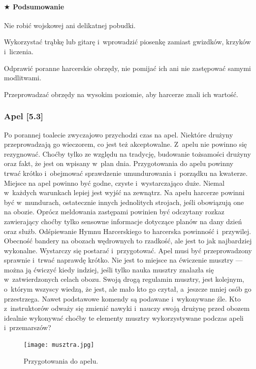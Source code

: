 \documentclass[a5paper,10pt,titlepage,twoside]{article}
\newcommand*{\thecheckbox}{\hss$\Box$} %
\newenvironment*{checklist}
{\list{}{%
\renewcommand*{\makelabel}[1]{\thecheckbox}}}
{\endlist}
\begin{document}
\paragraph{$\bigstar$ Podsumowanie}
\begin{checklist}
\item Nie robić wojskowej ani delikatnej pobudki.
\item Wykorzystać trąbkę lub gitarę i~wprowadzić piosenkę zamiast gwizdków, krzyków i~liczenia.
\item Odprawić poranne harcerskie obrzędy, nie pomijać ich ani nie zastępować samymi modlitwami.
\item Przeprowadzać obrzędy na wysokim poziomie, aby harcerze znali ich wartość.
\end{checklist}
\subsubsection{Apel [5.3]}
Po porannej toalecie zwyczajowo przychodzi czas na apel. Niektóre drużyny przeprowadzają go wieczorem, co jest też akceptowalne. Z~apelu nie powinno się rezygnować. Choćby tylko ze względu na tradycję, budowanie tożsamości drużyny oraz fakt, że jest on wpisany w~plan dnia. Przygotowania do apelu powinny trwać krótko i~obejmować sprawdzenie umundurowania i~porządku na kwaterze. Miejsce na apel powinno być godne, czyste i~wystarczająco duże. Niemal w~każdych warunkach lepiej jest wyjść na zewnątrz. Na apelu harcerze powinni być w~mundurach, ostatecznie innych jednolitych strojach, jeśli obowiązują one na obozie. Oprócz meldowania zastępami powinien być odczytany rozkaz zawierający choćby tylko sensowne informacje dotyczące planów na dany dzień oraz służb. Odśpiewanie Hymnu Harcerskiego to harcerska powinność i~przywilej. Obecność bandery na obozach wędrownych to rzadkość, ale jest to jak najbardziej wykonalne. Wystarczy się postarać i~przygotować. Apel musi być przeprowadzony sprawnie i~trwać naprawdę krótko. Nie jest to miejsce na ćwiczenie musztry --- można ją ćwiczyć kiedy indziej, jeśli tylko nauka musztry znalazła się w~zatwierdzonych celach obozu. Swoją drogą regulamin musztry, jest kolejnym, o~którym wszyscy wiedzą, że jest, ale mało kto go czytał, a~jeszcze mniej osób go przestrzega. Nawet podstawowe komendy są podawane i~wykonywane źle. Kto z~instruktorów odważy się zmienić nawyki i~nauczy swoją drużynę przed obozem idealnie wykonywać choćby te elementy musztry wykorzystywane podczas apeli i~przemarszów?
\begin{figure}[htp]
\centering
\texttt{[image: musztra.jpg]}
\caption{Przygotowania do apelu.}\label{fig:musztra}
\end{figure}
\end{document}
